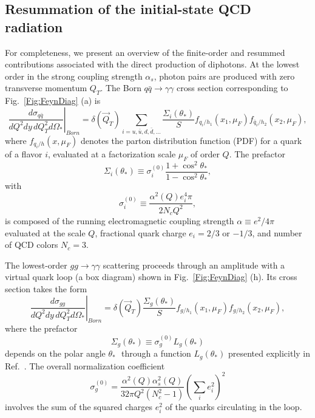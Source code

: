 \documentclass[12pt,english,aps,preprint,prd,letterpaper,fleqn,nofootinbib,showpacs,showkeys,tightenlines,floatfix]{revtex4}
\begin{document}
\subsection{Resummation of the initial-state QCD radiation \label{subsection:ISRResummation}}

For completeness, we present an overview of the finite-order and resummed
contributions associated with the direct production of diphotons.
At the lowest order in the strong coupling strength $\alpha_{s}$,
photon pairs are produced with zero transverse momentum $Q_{T}$.
The Born $q\bar{q}\rightarrow\gamma\gamma$ cross section corresponding
to Fig.~\ref{Fig:FeynDiag} (a) is \begin{equation}
\left.\frac{d\sigma_{q\bar{q}}}{dQ^{2}dy\, dQ_{T}^{2}d\Omega_{*}}\right|_{Born}=\delta(\vec{Q}_{T})\sum_{i=u,\bar{u},d,\bar{d},...}\frac{\Sigma_{i}(\theta_{*})}{S}f_{q_{i}/h_{1}}(x_{1},\mu_{F})f_{\bar{q}_{i}/h_{2}}(x_{2},\mu_{F}),\label{Bornqqbar}\end{equation}
 where $f_{q_{i}/h}(x,\mu_{F})$ denotes the parton distribution function
(PDF) for a quark of a flavor $i$, evaluated at a factorization scale
$\mu_{F}$ of order $Q$. The prefactor\begin{equation}
\Sigma_{i}(\theta_{*})\equiv\sigma_{i}^{(0)}\frac{1+\cos^{2}\theta_{*}}{1-\cos^{2}\theta_{*}},\label{Sigmaqqbar}\end{equation}
 with\begin{equation}
\sigma_{i}^{(0)}\equiv\frac{\alpha^{2}(Q)e_{i}^{4}\pi}{2N_{c}Q^{2}},\end{equation}
 is composed of the running electromagnetic coupling strength $\alpha\equiv e^{2}/4\pi$
evaluated at the scale $Q$, fractional quark charge $e_{i}=2/3$
or $-1/3$, and number of QCD colors $N_{c}=3$.

The lowest-order $gg\rightarrow\gamma\gamma$ scattering proceeds through
an amplitude with a virtual quark loop (a box diagram) shown in Fig.~\ref{Fig:FeynDiag} (h). 
Its cross section takes the form\begin{equation}
\left.\frac{d\sigma_{gg}}{dQ^{2}dy\, dQ_{T}^{2}d\Omega_{*}}\right|_{Born}=\delta(\vec{Q}_{T})\frac{\Sigma_{g}(\theta_{*})}{S}f_{g/h_{1}}(x_{1},\mu_{F})f_{g/h_{2}}(x_{2},\mu_{F}),\label{Borngg}\end{equation}
 where the prefactor\begin{equation}
\Sigma_{g}(\theta_{*})\equiv\sigma_{g}^{(0)}L_{g}(\theta_{*})\label{Sigmag}\end{equation}
 depends on the polar angle $\theta_{*}$ $ $ through a function
$L_{g}(\theta_{*})$ presented explicitly in Ref.~\cite{Nadolsky:2007ba}.
The overall normalization coefficient\begin{equation}
\sigma_{g}^{(0)}=\frac{\alpha^{2}(Q)\alpha_{s}^{2}(Q)}{32\pi Q^{2}(N_{c}^{2}-1)}\left(\sum_{i}e_{i}^{2}\right)^{2}\end{equation}
 involves the sum of the squared charges $e_{i}^{2}$ of the quarks
circulating in the loop.
\end{document}

